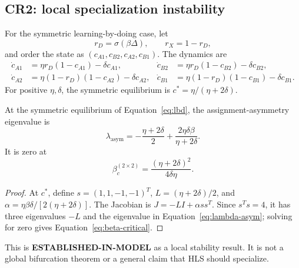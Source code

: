 \subsection{CR2: local specialization instability}
For the symmetric learning-by-doing case, let
\begin{equation}
r_D=\sigma(\beta\Delta),\qquad r_X=1-r_D,
\label{eq:router}
\end{equation}
and order the state as $(c_{A1},c_{B2},c_{A2},c_{B1})$. The dynamics are
\begin{align}
\dot c_{A1}&=\eta r_D(1-c_{A1})-\delta c_{A1}, &
\dot c_{B2}&=\eta r_D(1-c_{B2})-\delta c_{B2}, \nonumber\\
\dot c_{A2}&=\eta(1-r_D)(1-c_{A2})-\delta c_{A2}, &
\dot c_{B1}&=\eta(1-r_D)(1-c_{B1})-\delta c_{B1}.
\label{eq:lbd}
\end{align}
For positive $\eta,\delta$, the symmetric equilibrium is $c^*=\eta/(\eta+2\delta)$.

\begin{proposition}
At the symmetric equilibrium of Equation~\eqref{eq:lbd}, the assignment-asymmetry eigenvalue is
\begin{equation}
\lambda_{\mathrm{asym}}=-\frac{\eta+2\delta}{2}+\frac{2\eta\delta\beta}{\eta+2\delta}.
\label{eq:lambda-asym}
\end{equation}
It is zero at
\begin{equation}
\beta_c^{(2\times2)}=\frac{(\eta+2\delta)^2}{4\delta\eta}.
\label{eq:beta-critical}
\end{equation}
\end{proposition}
\begin{proof}
At $c^*$, define $s=(1,1,-1,-1)^T$, $L=(\eta+2\delta)/2$, and $\alpha=\eta\beta\delta/[2(\eta+2\delta)]$. The Jacobian is $J=-LI+\alpha ss^T$. Since $s^Ts=4$, it has three eigenvalues $-L$ and the eigenvalue in Equation~\eqref{eq:lambda-asym}; solving for zero gives Equation~\eqref{eq:beta-critical}.
\end{proof}
This is \textbf{ESTABLISHED-IN-MODEL} as a local stability result. It is not a global bifurcation theorem or a general claim that HLS should specialize.

